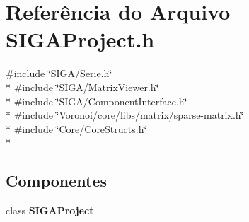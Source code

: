 \section{Referência do Arquivo S\+I\+G\+A\+Project.\+h}
\label{_s_i_g_a_project_8h}
{\ttfamily \#include \char`\"{}S\+I\+G\+A/\+Serie.\+h\char`\"{}}\\*
{\ttfamily \#include \char`\"{}S\+I\+G\+A/\+Matrix\+Viewer.\+h\char`\"{}}\\*
{\ttfamily \#include \char`\"{}S\+I\+G\+A/\+Component\+Interface.\+h\char`\"{}}\\*
{\ttfamily \#include \char`\"{}Voronoi/core/libs/matrix/sparse-\/matrix.\+h\char`\"{}}\\*
{\ttfamily \#include \char`\"{}Core/\+Core\+Structs.\+h\char`\"{}}\\*
\subsection*{Componentes}
\begin{DoxyCompactItemize}
\item 
class {\bf S\+I\+G\+A\+Project}
\end{DoxyCompactItemize}
